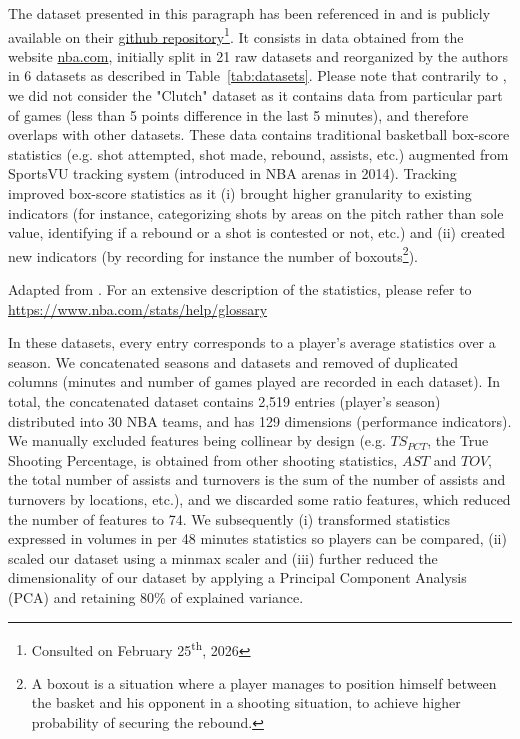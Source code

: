 The dataset presented in this paragraph has been referenced in \cite{muniz_weighted_2022} and is publicly available on their \href{https://github.com/meganlynn12/jsa-cdkm?tab=readme-ov-file}{github repository}\footnote{Consulted on February 25\textsuperscript{th}, 2026}.
It consists in data obtained from the website \href{https://www.nba.com/}{nba.com}, initially split in 21 raw datasets and reorganized by the authors in 6 datasets as described in Table~\ref{tab:datasets}.
Please note that contrarily to \citeauthor{muniz_weighted_2022}, we did not consider the "Clutch" dataset as it contains data from particular part of games (less than 5 points difference in the last 5 minutes), and therefore overlaps with other datasets. 
These data contains traditional basketball box-score statistics (e.g. shot attempted, shot made, rebound, assists, etc.) augmented from SportsVU tracking system (introduced in NBA arenas in 2014).
Tracking improved box-score statistics as it (i) brought higher granularity to existing indicators (for instance, categorizing shots by areas on the pitch rather than sole value, identifying if a rebound or a shot is contested or not, etc.) and (ii) created new indicators (by recording for instance the number of boxouts\footnote{A boxout is a situation where a player manages to position himself between the basket and his opponent in a shooting situation, to achieve higher probability of securing the rebound.}).

\begin{table}
  \scriptsize
  \caption{Tracking-improved dataset description}
  \label{tab:datasets}
  
  {\raggedright \small Adapted from \cite{muniz_weighted_2022}. For an extensive description of the statistics, please refer to \url{https://www.nba.com/stats/help/glossary} }
\end{table}

In these datasets, every entry corresponds to a player's average statistics over a season. 
We concatenated seasons and datasets and removed of duplicated columns (minutes and number of games played are recorded in each dataset).
In total, the concatenated dataset contains 2,519 entries (player's season) distributed into 30 NBA teams, and has 129 dimensions (performance indicators).
We manually excluded features being collinear by design (e.g. $TS_{PCT}$, the True Shooting Percentage, is obtained from other shooting statistics, $AST$ and $TOV$, the total number of assists and turnovers is the sum of the number of assists and turnovers by locations, etc.), and we discarded some ratio features, which reduced the number of features to 74.
We subsequently (i) transformed statistics expressed in volumes in per 48 minutes statistics so players can be compared, (ii) scaled our dataset using a minmax scaler and (iii) further reduced the dimensionality of our dataset by applying a Principal Component Analysis (PCA) and retaining 80\% of explained variance.

